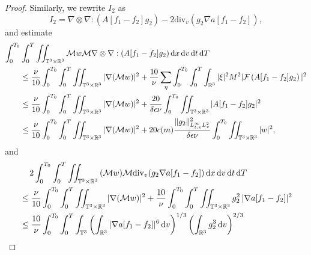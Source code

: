 \documentclass[11pt,american, reqno]{amsart}
\numberwithin{equation}{section}
\newcommand{\R}{\mathbb R}
\newcommand{\1}{\mathds{1}}
\newcommand{\dt}{\, {\rm d} t}
\newcommand{\dT}{\, {\rm d} T}
\newcommand{\dv}{\, {\rm d} v}
\newcommand{\dx}{\, {\rm d} x}
\newcommand{\CalM}{\mathcal{M}}
\newcommand{\CalF}{\mathcal{F}}
\newcommand{\vpran}[1]{\left(#1\right)}
\newcommand{\Eps}{\epsilon}
\newcommand{\T}{\mathbb{T}}
\numberwithin{equation}{section}
\begin{document}
\begin{proof}

Similarly, we rewrite $I_2$ as 
$$
I_2 = \nabla \otimes \nabla : ( A[f_1-f_2] g_2)  - 2 \textrm{div}_v (g_2 \nabla a[f_1-f_2]),
$$
and estimate
\begin{align*}
\int_0^{T_0} & \int_0^{T} \iint_{\T^3 \times \R^3} {{\CalM} w} {\CalM} {\nabla \otimes \nabla : ( A[f_1-f_2] g_2)} \dx\dv\dt\dT  
\\
&\leq  
\frac{\nu}{10}\int_0^{T_0}\int_0^{T} \iint_{\T^3 \times \R^3} 
|\nabla(\CalM w)| ^2 %
+ \frac{10}{\nu} \sum_{\eta}\int_0^{T_0}\int_0^{T} \int_{\R^3}  |\xi|^2 {M}^2  |\CalF \vpran{A[f_1-f_2] g_2}|^2 %
\\
&\le  
\frac{\nu}{10}\int_0^{T_0}\int_0^{T} \iint_{\T^3 \times \R^3} |\nabla(\CalM w)| ^2 %
+ \frac{20}{ \delta \Eps \nu} \int_0^{T_0}\iint_{\T^3 \times \R^3}  |A[f_1-f_2] g_2|^2 %
\\
&\le   
\frac{\nu}{10}\int_0^{T_0}\int_0^{T} \iint_{\T^3 \times \R^3} |\nabla(\CalM w)| ^2 %
+ 20 c(m) \frac{\|g_2\|^2_{L_{t,x}^\infty L^2_v}}{ \delta \Eps \nu} \int_0^{T_0}\iint_{\T^3 \times \R^3} |w|^2, %
\end{align*} 
and 
\begin{align*}
& \quad \, 2 \int_0^{T_0} \int_0^{T} \iint_{\T^3 \times \R^3}  {( {\CalM} w)  } {\CalM}{\textrm{div}_v(g_2 \nabla a[f_1-f_2])}  \dx\dv\dt\dT  
\\
& \le  
\frac{\nu}{10}\int_0^{T_0}\int_0^{T} \iint_{\T^3 \times \R^3} |\nabla(\CalM w)| ^2 %
+ \frac{10}{\nu} \int_0^{T_0}\int_0^{T} \iint_{\T^3 \times \R^3} g_2^2 \, |\nabla{a[f_1-f_2]}|^2 %
\\
&\le  
\frac{10}{\nu} \int_0^{T_0}\int_0^{T} \int_{\T^3}  \left(\int_{\mathbb{R}^3 }|\nabla a[f_1-f_2] |^6 \dv \right)^{1/3}  \left(  \int_{\mathbb{R}^3 } g_2^3 \dv \right)^{2/3} %

\end{align*}
\end{proof}
\end{document}
